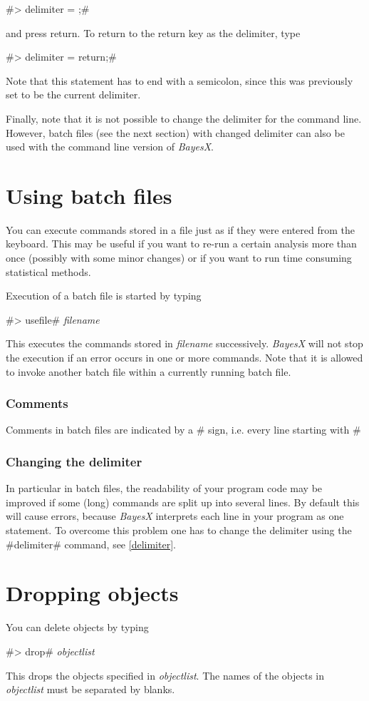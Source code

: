 #> delimiter = ;#

and press return. To return to the return key as the delimiter, type

#> delimiter = return;#

Note that this statement has to end with a semicolon, since this was previously set to be the current delimiter.

Finally, note that it is not possible to change the delimiter for the command line. However, batch files (see the next section)
with changed delimiter can also be used with the command line version of {\it BayesX}.

\section{Using batch files}
\label{batch} 

You can execute commands stored in a file just as if they were
entered from the keyboard. This may be useful if you want to
re-run a certain analysis more than once (possibly with some minor
changes) or if you want to run time consuming statistical methods.

Execution of a batch file is started by typing

#> usefile# {\em filename}

This executes the commands stored in {\em filename} successively.
{\em BayesX} will not stop the execution if an error occurs in one
or more commands. Note that it is allowed to invoke another batch
file within a currently running batch file.


\subsubsection*{Comments}

Comments in batch files are indicated by a  #%
sign, i.e. every line
starting with #%

\subsubsection*{Changing the delimiter}

In particular in batch files, the readability of your program code
may be improved if some (long) commands are split up into several
lines. By default this will cause errors, because {\em BayesX}
interprets each line in your program as one statement. To overcome
this problem one has to change the delimiter using the #delimiter#
command, see \autoref{delimiter}.

\section{Dropping objects}
 

You can delete objects by typing

#> drop# {\em objectlist}

This drops the objects specified in {\em objectlist}. The names of
the objects in {\em objectlist} must be separated by blanks.
